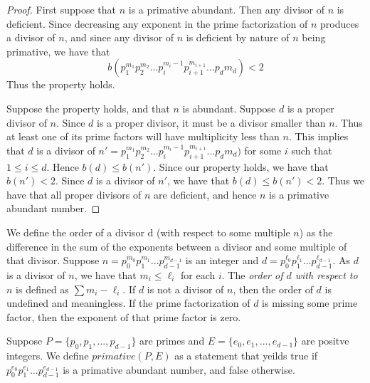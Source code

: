 \documentclass[../paper.tex]{subfiles}
\begin{document}
\begin{proof}
	First suppose that $n$ is a primative abundant. Then any divisor of $n$
is deficient. Since decreasing any exponent in the prime 
factorization of $n$ produces a divisor of $n$, and since any
divisor of $n$ is deficient by nature of $n$ being primative,
we have that 
$$b(p_1^{m_1} p_2^{m_2} ...   p_i^{m_i - 1} p_{i+1}^{m_{i+1}}
... p_d{m_d}) < 2$$
Thus the property holds.

	Suppose the property holds, and that $n$ is abundant. Suppose $d$
is a proper divisor of $n$. Since $d$ is a proper divisor, it must
be a divisor smaller than $n$. Thus at least one of its prime factors
will have multiplicity less than $n$. This implies that $d$ is a 
divisor of
$n' = p_1^{m_1} p_2^{m_2} ...   p_i^{m_i - 1} p_{i+1}^{m_{i+1}}
... p_d{m_d})$ 
for some $i$ such that $1 \leq i \leq d$. Hence $b(d) \leq b(n')$.
Since our property holds, we have that $b(n') < 2$. Since $d$ is
a divisor of $n'$, we have that $b(d) \leq b(n') < 2$. Thus we
have that all proper divisors of $n$ are deficient, and hence $n$ is 
a primative abundant number.
\end{proof}

We define the order of a divisor d (with respect to some multiple
$n$) as the difference in the sum of the exponents between a
divisor and some multiple of that divisor. Suppose $n = p_0^{m_0}
p_1^{m_1} ... p_{d-1}^{m_{d-1}}$ is an integer and $d = p_0^{\ell_0}
p_1^{\ell_1} ... p_{d-1}^{\ell_{d-1}}$. As $d$ is a divisor of
$n$, we have that $m_i \leq \ell_i$ for each $i$. The
\textit{order of $d$ with respect to $n$} is defined as $\sum {m_i
- \ell_i}$. If $d$ is not a divisor of $n$, then the order of $d$
is undefined and meaningless. If the prime factorization of $d$ is
missing some prime factor, then the exponent of that prime factor
is zero.


Suppose $P = \{p_0, p_1, ...,p_{d-1}\}$ are primes and 
$E = \{e_0, e_1, ..., e_{d-1} \}$ are positve integers.
We define $primative(P,E)$ as a statement that yeilds true
if $p_0^{e_0} p_1^{e_1} ... p_{d-1}^{e_{d-1}}$ is a primative
abundant number, and false otherwise.

\end{document}
